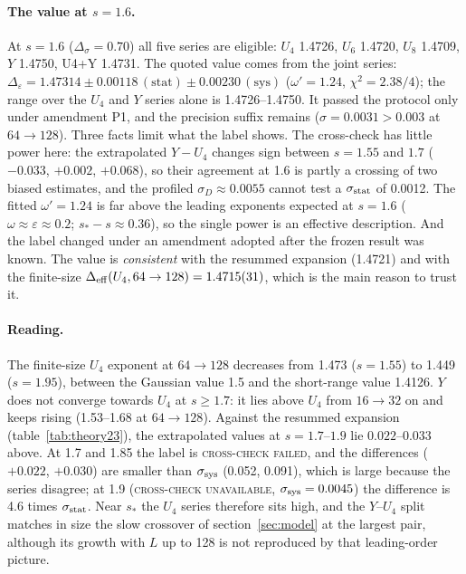 \documentclass[10pt,a4paper]{article}
\newcommand{\Ds}{\Delta_\sigma}
\newcommand{\De}{\Delta_\varepsilon}
\newcommand{\Deff}{\Delta_{\rm eff}}
\newcommand{\lbl}[1]{{\mdseries\scshape #1}}
\newcommand{\sstat}{\sigma_{\rm stat}}
\newcommand{\ssys}{\sigma_{\rm sys}}
\begin{document}
\paragraph{The value at $s=1.6$.} At $s=1.6$ ($\Ds=0.70$) all five series are eligible: $U_4$ 1.4726, $U_6$ 1.4720, $U_8$ 1.4709, $Y$ 1.4750, U4+Y
1.4731. The quoted value comes from the joint series: $\De=1.47314\pm0.00118\,(\mathrm{stat})\pm0.00230\,(\mathrm{sys})$ ($\omega'=1.24$,
$\chi^2=2.38/4$); the range over the $U_4$ and $Y$ series alone is 1.4726--1.4750. It passed the protocol only under amendment P1, and the
precision suffix remains ($\sigma=0.0031>0.003$ at $64\to128$). Three facts limit what the label shows. The cross-check has little power here:
the extrapolated $Y-U_4$ changes sign between $s=1.55$ and $1.7$ ($-0.033$, $+0.002$, $+0.068$), so their agreement at 1.6 is partly a crossing of
two biased estimates, and the profiled $\sigma_D\approx0.0055$ cannot test a $\sstat$ of 0.0012. The fitted $\omega'=1.24$ is far above the
leading exponents expected at $s=1.6$ ($\omega\approx\varepsilon\approx0.2$; $s_*-s\approx0.36$), so the single power is an effective
description. And the label changed under an amendment adopted after the frozen result was known. The value is \emph{consistent} with the
resummed expansion (1.4721) and with the finite-size $\Deff(U_4,64\to128)=1.4715(31)$, which is the main reason to trust it.

\paragraph{Reading.} The finite-size $U_4$ exponent at $64\to128$ decreases from 1.473 ($s=1.55$) to 1.449 ($s=1.95$), between the Gaussian value
1.5 and the short-range value 1.4126. $Y$ does not converge towards $U_4$ at $s\ge1.7$: it lies above $U_4$ from $16\to32$ on and keeps rising
(1.53--1.68 at $64\to128$). Against the resummed expansion (table~\ref{tab:theory23}), the extrapolated values at $s=1.7$--$1.9$ lie
$0.022$--$0.033$ above. At 1.7 and 1.85 the label is \lbl{cross-check failed}, and the differences ($+0.022$, $+0.030$) are smaller than $\ssys$
(0.052, 0.091), which is large because the series disagree; at 1.9 (\lbl{cross-check unavailable}, $\ssys=0.0045$) the difference is 4.6
times $\sstat$. Near $s_*$ the $U_4$ series therefore sits high, and the $Y$--$U_4$
split matches in size the slow crossover of section~\ref{sec:model} at the largest pair, although its growth with $L$ up to 128 is not
reproduced by that leading-order picture.
\end{document}
